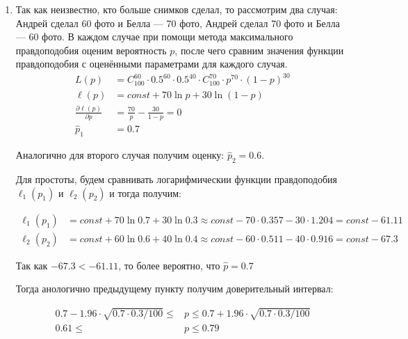 \begin{enumerate}
\begin{enumerate}
\item Так как неизвестно, кто больше снимков сделал, то рассмотрим два случая: Андрей сделал 60 фото и Белла — 70 фото, Андрей сделал 70 фото и Белла — 60 фото. В каждом случае при помощи метода максимального правдоподобия оценим вероятность $p$, после чего сравним значения функции правдоподобия с оценёнными параметрами для каждого случая.
\begin{align*}
L(p)&=C^{60}_{100}\cdot 0.5^{60}\cdot 0.5^{40}\cdot C^{70}_{100}\cdot p^{70}\cdot(1-p)^{30} \\
\ell(p)&=const+70\ln p+30\ln(1-p) \\
\frac{\partial \ell (p)}{\partial p}&= \frac{70}{p}-\frac{30}{1-p}=0 \\
\hat{p}_1 &= 0.7
\end{align*}

Аналогично для второго случая получим оценку: $\hat{p}_2=0.6$.

Для простоты, будем сравнивать логарифмическии функции правдоподобия $\ell_1(p_1)$ и $\ell_2(p_2)$ и тогда получим:

\begin{align*}
\ell_1(p_1)&=const+70\ln 0.7+30\ln 0.3\approx const-70\cdot0.357-30\cdot 1.204=const-61.11 \\
\ell_2(p_2)&=const+60\ln 0.6+40\ln 0.4\approx const-60\cdot0.511-40\cdot0.916=const-67.3
\end{align*}

Так как $-67.3<-61.11$, то более вероятно, что $\hat{p}=0.7$

Тогда анологично предыдущему пункту получим доверительный интервал:

\begin{align*}
0.7-1.96\cdot\sqrt{0.7\cdot0.3/100}\le &p \le0.7+1.96\cdot\sqrt{0.7\cdot0.3/100} \\
0.61 \le &p \le 0.79
\end{align*}
\end{enumerate}
\end{enumerate}
